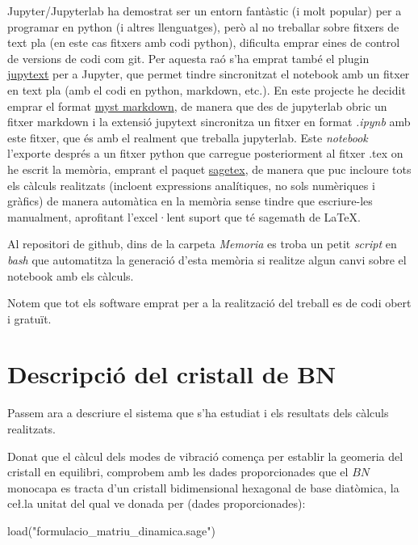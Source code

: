 \documentclass[12pt]{article} %
\begin{document}
{Jupyter/Jupyterlab ha demostrat ser un entorn fantàstic (i molt popular) per a programar en python (i altres llenguatges), però al no treballar sobre fitxers de text pla (en este cas fitxers amb codi python), dificulta emprar eines de control de versions de codi com git. Per aquesta raó s’ha emprat també el plugin \href{https://jupytext.readthedocs.io/en/latest/}{jupytext} per a Jupyter, que permet tindre sincronitzat el notebook amb un fitxer en text pla (amb el codi en python, markdown, etc.). En este projecte he decidit emprar el format \href{https://jupyterbook.org/content/myst.html}{myst markdown}, de manera que des de jupyterlab obric un fitxer markdown i la extensió jupytext sincronitza un fitxer en format \textit{.ipynb} amb este fitxer, que és amb el realment que treballa jupyterlab. Este \emph{notebook} l'exporte després a un fitxer python que carregue posteriorment al fitxer .tex on he escrit la memòria, emprant el paquet \href{https://ctan.org/pkg/sagetex}{sagetex}, de manera que puc incloure tots els càlculs realitzats (incloent expressions analítiques, no sols numèriques i gràfics) de manera automàtica en la memòria sense tindre que escriure-les manualment, aprofitant l'excel·lent suport que té sagemath de \LaTeX . 

Al repositori de github, dins de la carpeta \textit{Memoria} es troba un petit \textit{script} en \textit{bash} que automatitza la generació d'esta memòria si realitze algun canvi sobre el notebook amb els càlculs.

Notem que tot els software emprat per a la realització del treball es de codi obert i gratuït.


\newpage
\section{Descripció del cristall de BN}

Passem ara a descriure el sistema que s'ha estudiat i els resultats dels càlculs realitzats.

Donat que el càlcul dels modes de vibració comen\c{c}a per establir la geomeria del cristall en equilibri, comprobem amb les dades proporcionades que el $BN$ monocapa es tracta d'un cristall bidimensional hexagonal de base diatòmica, la ce\l.la unitat del qual ve donada per (dades proporcionades):

\begin{sagesilent}
load("formulacio_matriu_dinamica.sage")
\end{sagesilent}

}
\end{document}
